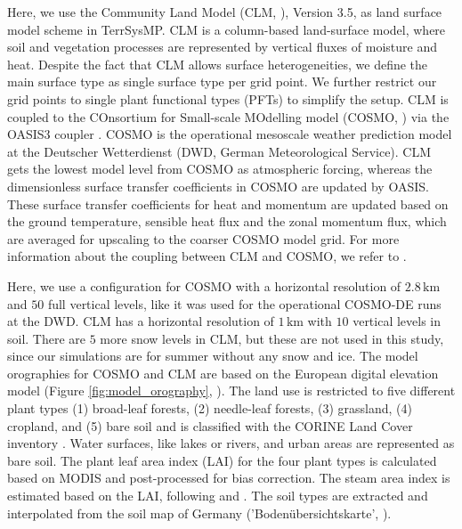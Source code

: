 \documentclass[HESSD, manuscript]{copernicus}
\begin{document}
Here, we use the Community Land Model (CLM, \citealt{oleson_technical_2004, oleson_k._w._improvements_2008}), Version 3.5, as land surface model scheme in TerrSysMP.
CLM is a column-based land-surface model, where soil and vegetation processes are represented by vertical fluxes of moisture and heat.
Despite the fact that CLM allows surface heterogeneities, we define the main surface type as single surface type per grid point.
We further restrict our grid points to single plant functional types (PFTs) to simplify the setup.
CLM is coupled to the COnsortium for Small-scale MOdelling model (COSMO, \citealt{baldauf_operational_2011}) via the OASIS3 coupler \citep{valcke_oasis3_2013}.
COSMO is the operational mesoscale weather prediction model at the Deutscher Wetterdienst (DWD, German Meteorological Service).
CLM gets the lowest model level from COSMO as atmospheric forcing, whereas the dimensionless surface transfer coefficients in COSMO are updated by OASIS.
These surface transfer coefficients for heat and momentum are updated based on the ground temperature, sensible heat flux and the zonal momentum flux, which are averaged for upscaling to the coarser COSMO model grid. 
For more information about the coupling between CLM and COSMO, we refer to \citet{shrestha_scale-consistent_2014}.

Here, we use a configuration for COSMO with a horizontal resolution of $2.8\,\text{km}$ and $50$ full vertical levels, like it was used for the operational COSMO-DE runs at the DWD.
CLM has a horizontal resolution of $1\,\text{km}$ with $10$ vertical levels in soil.
There are $5$ more snow levels in CLM, but these are not used in this study, since our simulations are for summer without any snow and ice.
The model orographies for COSMO and CLM are based on the European digital elevation model (Figure \ref{fig:model_orography}, \citealt{european_environment_agency_digital_2013}).
The land use is restricted to five different plant types (1) broad-leaf forests, (2) needle-leaf forests, (3) grassland, (4) cropland, and
(5) bare soil and is classified with the CORINE Land Cover inventory \citep{keil_corine_2011}.
Water surfaces, like lakes or rivers, and urban areas are represented as bare soil.
The plant leaf area index (LAI) for the four plant types is calculated based on MODIS \citep{myneni_global_2002} and post-processed for bias correction.
The steam area index is estimated based on the LAI, following \citet{lawrence_representing_2007} and \citet{zeng_coupling_2002}.
The soil types are extracted and interpolated from the soil map of Germany ('Boden\"ubersichtskarte', \citealt{bundesanstalt_fuer_geowissenschaften_und_rohstoffe_bodenuebersichtskarte_2016}).
\end{document}
